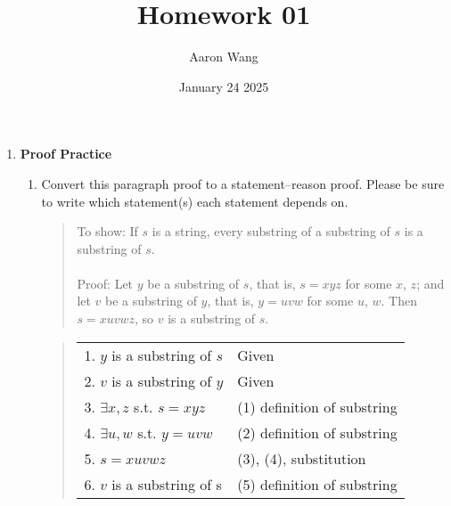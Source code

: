 \documentclass{article}
\title{Homework 01}
\author{Aaron Wang}
\date{January 24 2025}
\begin{document}
\maketitle
\begin{enumerate}
    \item \textbf{Proof Practice}
    \begin{enumerate}
        \item Convert this paragraph proof to a statement–reason proof. Please be sure to write which statement(s) each statement depends on.
        \begin{quote}
            To show: If $s$ is a string, every substring of a substring of $s$ is a substring of $s$.\\\vspace{1mm}\\
            Proof: 
            Let $y$ be a substring of $s$, that is, $s = xyz$ for some $x$, $z$; 
            and let $v$ be a substring of $y$, that is, $y = uvw$ for some $u$, $w$. 
            Then $s = xuvwz$, so $v$ is a substring of $s$. 
        \end{quote}
        \textcolor{red}{\begin{quote}
        \begin{tabular}{l l}
             1. $y$ is a substring of $s$ &  Given\\
             2. $v$ is a substring of $y$ &  Given\\
             3. $\exists x,z$ s.t. $s=xyz$ & (1) definition of substring\\
             4. $\exists u,w$ s.t. $y=uvw$ & (2) definition of substring\\
             5. $s=xuvwz$ & (3), (4), substitution\\
             6. $v$ is a substring of s & (5) definition of substring
        \end{tabular}
        \end{quote}}


\end{enumerate}
\end{enumerate}
\end{document}
